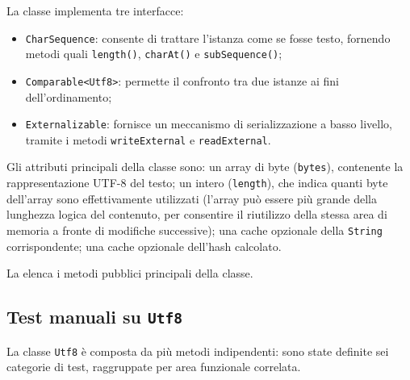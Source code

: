 La classe implementa tre interfacce:
\begin{itemize}
    \item \texttt{CharSequence}: consente di trattare l'istanza come
    se fosse testo, fornendo metodi quali \texttt{length()},
    \texttt{charAt()} e \texttt{subSequence()};
    \item \texttt{Comparable<Utf8>}: permette il confronto tra due
    istanze ai fini dell'ordinamento;
    \item \texttt{Externalizable}: fornisce un meccanismo di
    serializzazione a basso livello, tramite i metodi
    \texttt{writeExternal} e \texttt{readExternal}.
\end{itemize}

Gli attributi principali della classe sono: un array di byte
(\texttt{bytes}), contenente la rappresentazione UTF-8 del testo; un
intero (\texttt{length}), che indica quanti byte dell'array sono
effettivamente utilizzati (l'array può essere più grande della
lunghezza logica del contenuto, per consentire il riutilizzo della
stessa area di memoria a fronte di modifiche successive); una cache
opzionale della \texttt{String} corrispondente; una cache opzionale
dell'hash calcolato.

La  elenca i metodi pubblici principali della
classe.

\subsection{Test manuali su \texttt{Utf8}}

La classe \texttt{Utf8} è composta da più metodi indipendenti: sono
state definite sei categorie di test, raggruppate per area funzionale
correlata.

